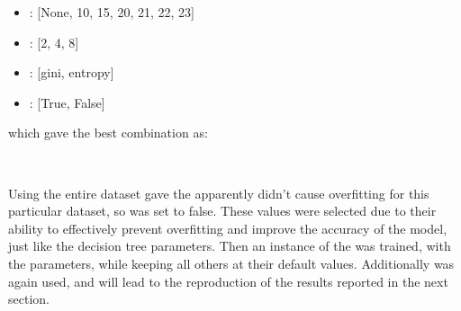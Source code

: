 \begin{center}
    \begin{minipage}{4in}
\begin{itemize}
    \item {}: [None, 10, 15, 20, 21, 22, 23]
    \item {}: [2, 4, 8]
    \item {}: [gini, entropy]
    \item {}: [True, False] \\
\end{itemize}
            \end{minipage}
\end{center}

which gave the best combination as:\

\begin{tcolorbox}[colback=white,
                  arc=0pt,
                outer=0pt]
\centering {} \, \,  \, \,  \, \, \\
   \end{tcolorbox}


Using the entire dataset gave the apparently didn't cause overfitting for this particular dataset, so  was set to false.
These values were selected due to their ability to effectively prevent overfitting and improve the accuracy of the model, just like the decision tree parameters.
Then an instance of the  was trained, with the parameters, while keeping all others at their default values.
Additionally  was again used, and will lead to the reproduction of the results reported in the next section.

